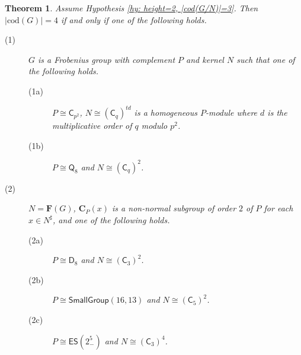 \documentclass[9pt]{article}
\newtheorem{thm}[lem]{\bf Theorem}
\begin{document}
\begin{thm}\label{thm: height=2, |cod(G/N)|=3, classification}
	Assume Hypothesis \ref{hy: height=2, |cod(G/N)|=3}.
	Then $|\mathrm{cod}(G)|=4$ if and only if one of the following holds.
	\begin{description}
		\item[(1)] $G$ is a Frobenius group with complement $P$ and kernel $N$ such that one of the following holds.
		 \begin{description}
			\item[(1a)] $P\cong \mathsf{C}_{p^{2}}$, $N\cong (\mathsf{C}_{q})^{td}$ is a homogeneous $P$-module where
			$d$ is the multiplicative order of $q$ modulo $p^{2}$.
			\item[(1b)] $P\cong \mathsf{Q}_8$ and $N\cong (\mathsf{C}_{q})^{2}$.
		 \end{description}
		 \item[(2)] $N=\mathbf{F}(G)$, 
		 $\mathbf{C}_{P}(x)$ is a non-normal subgroup of order $2$ of $P$ for each $x\in N^\sharp$,
		 and one of the following holds.
		 \begin{description}
			\item[(2a)] $P\cong \mathsf{D}_{8}$ and $N\cong (\mathsf{C}_{3})^{2}$.
			\item[(2b)] $P\cong\mathsf{SmallGroup}(16,13)$ and $N\cong (\mathsf{C}_{5})^{2}$. 
			\item[(2c)] $P\cong \mathsf{ES}(2^{5}_{-})$ and $N\cong (\mathsf{C}_{3})^{4}$.
		 \end{description}
	\end{description}
\end{thm}
\end{document}
